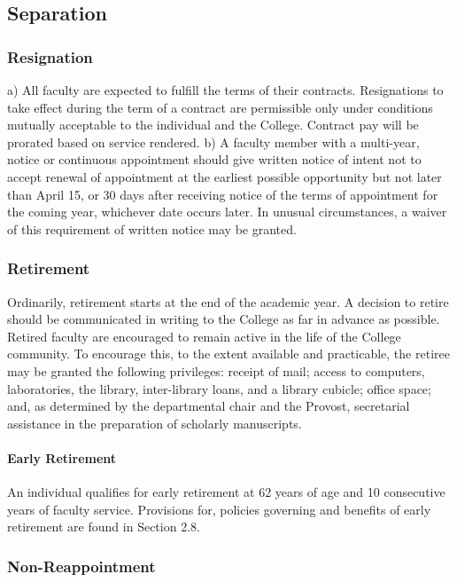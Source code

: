 \documentclass[letterpaper, 11pt]{article}
\begin{document}
	\subsection{Separation}
		\subsubsection{Resignation}
			a) All faculty are expected to fulfill the terms of their contracts.  Resignations to take effect during the term of a contract are permissible only under conditions mutually acceptable to the individual and the College.  Contract pay will be prorated based on service rendered.
			b) A faculty member with a multi-year, notice or continuous appointment should give written notice of intent not to accept renewal of appointment at the earliest possible opportunity but not later than April 15, or 30 days after receiving notice of the terms of appointment for the coming year, whichever date occurs later. In unusual circumstances, a waiver of this requirement of written notice may be granted.
		\subsubsection{Retirement}
			Ordinarily, retirement starts at the end of the academic year.  A decision to retire should be communicated in writing to the College as far in advance as possible.  Retired faculty are encouraged to remain active in the life of the College community.  To encourage this, to the extent available and practicable, the retiree may be granted the following privileges:  receipt of mail; access to computers, laboratories, the library, inter-library loans, and a library cubicle; office space; and, as determined by the departmental chair and the Provost, secretarial assistance in the preparation of scholarly manuscripts.
			\paragraph{Early Retirement}
				An individual qualifies for early retirement at 62 years of age and 10 consecutive years of faculty service.  Provisions for, policies governing and benefits of early retirement are found in Section 2.8.
		\subsubsection{Non-Reappointment}
\end{document}
